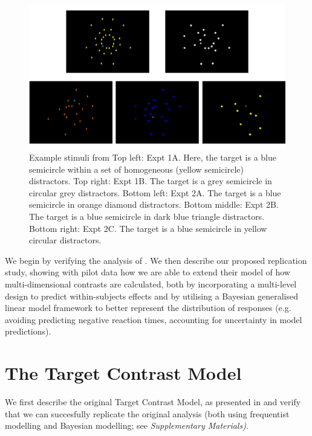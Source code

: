 \documentclass[preprint,12pt,authoryear]{elsarticle}
\begin{document}
\begin{figure}[ht]
\centering
\includegraphics[width=\textwidth]{../plots/example_stimuli_figure.pdf}
\caption{Example stimuli from \cite{buetti2019predicting} Top left: Expt 1A. Here, the target is a blue semicircle within a set of homogeneous (yellow semicircle) distractors. Top right: Expt 1B. The target is a grey semicircle in circular grey distractors. Bottom left: Expt 2A. The target is a blue semicircle in orange diamond distractors. Bottom middle: Expt 2B. The target is a blue semicircle in dark blue triangle distractors. Bottom right: Expt 2C. The target is a blue semicircle in yellow circular distractors.}
\label{fig:buetti2019_stimulus}
\end{figure}

We begin by verifying the analysis of \cite{buetti2019predicting}. We then describe our proposed replication study, showing with pilot data how we are able to extend their model of how multi-dimensional contrasts are calculated, both by incorporating a multi-level design to predict within-subjects effects and by utilising a Bayesian generalised linear model framework to better represent the distribution of responses (e.g. avoiding predicting negative reaction times, accounting for uncertainty in model predictions). 

\section{The Target Contrast Model}
\label{sec:reansalysis}

We first describe the original Target Contrast Model, as presented in \cite{buetti2019predicting} and verify that we can succesfully replicate the original analysis (both using frequentist modelling and Bayesian modelling; see \textit{Supplementary Materials)}.
\end{document}
